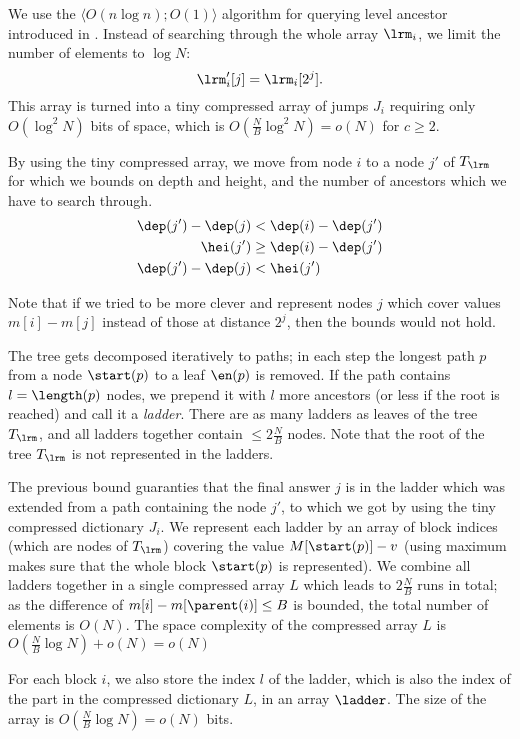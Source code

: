 \bigbreak

We use the $\langle O(n \log n); O(1) \rangle$ algorithm for querying level ancestor introduced in \cite{bender2004level}.
Instead of searching through the whole array $\lrm_i$, we limit the number of elements to $\log N$:
$$ \lrm'_i[j] = \lrm_i[2^j]. $$
This array is turned into a tiny compressed array of jumps $J_i$ requiring only $O(\log^2 N)$ bits of space, which is $O\left(\frac{N}{B} \log^2 N\right) = o(N)$ for $c \ge 2$.

By using the tiny compressed array, we move from node $i$ to a node $j'$ of $T_{\lrm}$ for which we bounds on depth and height, and the number of ancestors which we have to search through.
\begin{align*}
	\dep(j') - \dep(j) &< \dep(i) - \dep(j') \\
	\hei(j') &\ge \dep(i) - \dep(j') \\
	\dep(j') - \dep(j) &< \hei(j')
\end{align*}

Note that if we tried to be more clever and represent nodes $j$ which cover values $m[i] - m[j]$ instead of those at distance $2^j$, then the bounds would not hold.

\bigbreak

The tree gets decomposed iteratively to paths; in each step the longest path $p$ from a node $\start(p)$ to a leaf $\en(p)$ is removed.
If the path contains $l = \length(p)$ nodes, we prepend it with $l$ more ancestors (or less if the root is reached) and call it a \emph{ladder}.
There are as many ladders as leaves of the tree $T_{\lrm}$, and all ladders together contain $\le 2 \frac{N}{B}$ nodes.
Note that the root of the tree $T_{\lrm}$ is not represented in the ladders.

The previous bound guaranties that the final answer $j$ is in the ladder which was extended from a path containing the node $j'$, to which we got by using the tiny compressed dictionary $J_i$.
We represent each ladder by an array of block indices (which are nodes of $T_{\lrm}$) covering the value $M[\start(p)] - v$ (using maximum makes sure that the whole block $\start(p)$ is represented).
We combine all ladders together in a single compressed array $L$ which leads to $2 \frac{N}{B}$ runs in total; as the difference of $m[i] - m[\parent(i)] \le B$ is bounded, the total number of elements is $O(N)$.
The space complexity of the compressed array $L$ is $O\left(\frac{N}{B} \log N\right) + o(N) = o(N)$

For each block $i$, we also store the index $l$ of the ladder, which is also the index of the part in the compressed dictionary $L$, in an array $\ladder$.
The size of the array is $O\left(\frac{N}{B} \log N\right) = o(N)$ bits.


